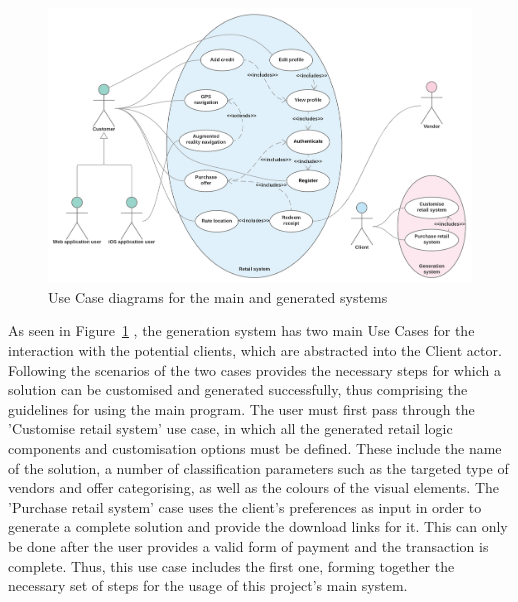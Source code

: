\begin{figure}[!ht]
\centering
\includegraphics[scale=0.2]{img/Use_Case_diagrams.png}
\caption{Use Case diagrams for the main and generated systems}
\label{fig:use_case_diagrams}
\end{figure}

As seen in Figure~\ref{fig:use_case_diagrams} , the generation system has two main Use Cases for the interaction with the potential clients, which are abstracted into the Client actor. Following the scenarios of the two cases provides the necessary steps for which a solution can be customised and generated successfully, thus comprising the guidelines for using the main program. The user must first pass through the 'Customise retail system' use case, in which all the generated retail logic components and customisation options must be defined. These include the name of the solution, a number of classification parameters such as the targeted type of vendors and offer categorising, as well as the colours of the visual elements. The 'Purchase retail system' case uses the client's preferences as input in order to generate a complete solution and provide the download links for it. This can only be done after the user provides a valid form of payment and the transaction is complete. Thus, this use case includes the first one, forming together the necessary set of steps for the usage of this project's main system.\\

